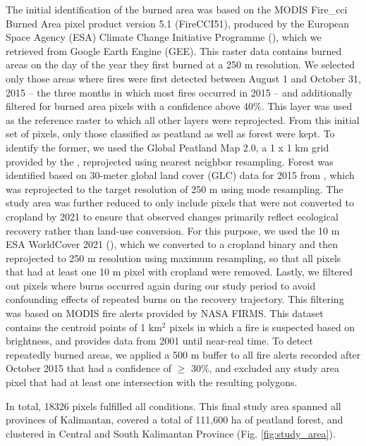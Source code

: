\documentclass[
  fontsize=12pt,
  paper=a4,
  parskip=half,
  headings=big,
  DIV=12
]{scrreprt}
\begin{document}
The initial identification of the burned area was based on the MODIS Fire\_cci Burned Area pixel product version 5.1 (FireCCI51), produced by the European Space Agency (ESA) Climate Change Initiative Programme (\cite{chuvieco_esa_2018}), which we retrieved from Google Earth Engine (GEE). This raster data contains burned areas on the day of the year they first burned at a 250 m resolution. We selected only those areas where fires were first detected between August 1 and October 31, 2015 -- the three months in which most fires occurred in 2015 -- and additionally filtered for burned area pixels with a confidence above 40\%. This layer was used as the reference raster to which all other layers were reprojected. From this initial set of pixels, only those classified as peatland as well as forest were kept. To identify the former, we used the Global Peatland Map 2.0, a 1 x 1 km grid provided by the \textcite{greifswald_mire_centre_global_2022}, reprojected using nearest neighbor resampling. Forest was identified based on 30-meter global land cover (GLC) data for 2015 from \textcite{li_improved_2023}, which was reprojected to the target resolution of 250 m using mode resampling. The study area was further reduced to only include pixels that were not converted to cropland by 2021 to ensure that observed changes primarily reflect ecological recovery rather than land-use conversion. For this purpose, we used the 10 m ESA WorldCover 2021 (\cite{zanaga_esa_2022}), which we converted to a cropland binary and then reprojected to 250 m resolution using maximum resampling, so that all pixels that had at least one 10 m pixel with cropland were removed. Lastly, we filtered out pixels where burns occurred again during our study period to avoid confounding effects of repeated burns on the recovery trajectory. This filtering was based on MODIS fire alerts provided by NASA FIRMS. This dataset contains the centroid points of 1 km$^2$ pixels in which a fire is suspected based on brightness, and provides data from 2001 until near-real time. To detect repeatedly burned areas, we applied a 500 m buffer to all fire alerts recorded  after October 2015 that had a confidence of $\geq$ 30\%, and excluded any study area pixel that had at least one intersection with the resulting polygons.

In total, 18326 pixels fulfilled all conditions. This final study area spanned all provinces of Kalimantan, covered a total of 111,600 ha of peatland forest, and clustered in Central and South Kalimantan Province (Fig. \ref{fig:study_area}).
\end{document}
